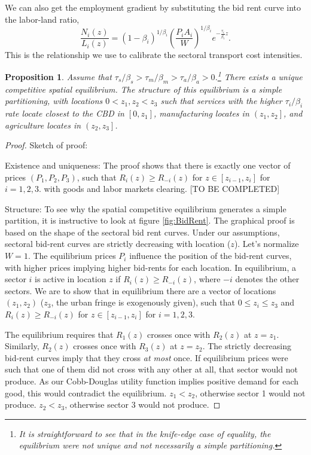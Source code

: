 \documentclass[12pt]{article}
\newtheorem{proposition}{Proposition}
\begin{document}
We can also get the employment gradient by substituting the bid rent curve into the labor-land ratio,
\begin{equation}
\label{eq:EmpGrad}
\frac{N_i(z)}{L_i(z)} = (1-\beta_i)^{1/\beta_i} \left(\frac{P_iA_i}{W}\right)^{1/\beta_i} e^{-\frac{\tau_i}{\beta_i} z}.
\end{equation}
This is the relationship we use to calibrate the sectoral transport cost intensities.

\begin{proposition}
Assume that $\tau_s/\beta_s>\tau_m/\beta_m>\tau_a/\beta_a>0$.\footnote{It is straightforward to see that in the knife-edge case of equality, the equilibrium were not unique and not necessarily a simple partitioning.} There exists a unique competitive spatial equilibrium. The structure of this equilibrium is a simple partitioning, with locations $0<z_1,z_2<z_3$ such that services with the higher $\tau_i/\beta_i$ rate locate closest to the CBD in $\left[0,z_1\right]$, manufacturing locates in $\left(z_1,z_2\right]$, and agriculture locates in $\left(z_2,z_3\right]$.
\end{proposition}
\begin{proof}
Sketch of proof:

Existence and uniqueness: The proof shows that there is exactly one vector of prices $(P_1, P_2, P_3)$, such that $R_i(z)\geq R_{-i}(z)$ for $z\in[z_{i-1},z_i]$ for $i=1,2,3.$ with goods and labor markets clearing. [TO BE COMPLETED]

Structure: To see why the spatial competitive equilibrium generates a simple partition, it is instructive to look at figure \ref{fig:BidRent}. The graphical proof is based on the shape of the sectoral bid rent curves.  Under our assumptions, sectoral bid-rent curves are strictly decreasing with location ($z$). Let's normalize $W=1$. The equilibrium prices $P_i$ influence the position of the bid-rent curves, with higher prices implying higher bid-rents for each location. In equilibrium, a sector $i$ is active in location $z$ if $R_i(z)\geq R_{-i}(z)$, where $-i$ denotes the other sectors. We are to show that in equilibrium there are a vector of locations $(z_1, z_2)$ ($z_3$, the urban fringe is exogenously given), such that $0\leq z_i\leq z_3$ and $R_i(z)\geq R_{-i}(z)$ for $z\in[z_{i-1},z_i]$ for $i=1,2,3.$

The equilibrium requires that $R_1(z)$ crosses once with $R_2(z)$ at $z=z_1$. Similarly, $R_2(z)$ crosses once with $R_3(z)$ at $z=z_2$. The strictly decreasing bid-rent curves imply that they cross \emph{at most} once. If equilibrium prices were such that one of them did not cross with any other at all, that sector would not produce. As our Cobb-Douglas utility function implies positive demand for each good, this would contradict the equilibrium. $z_1<z_2$, otherwise sector 1 would not produce. $z_2<z_3$, otherwise sector 3 would not produce.
\end{proof}
\end{document}

